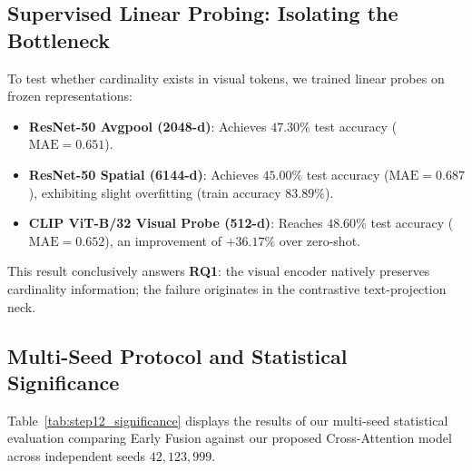\documentclass[conference]{IEEEtran}
\begin{document}
\subsection{Supervised Linear Probing: Isolating the Bottleneck}
To test whether cardinality exists in visual tokens, we trained linear probes on frozen representations:
\begin{itemize}
    \item \textbf{ResNet-50 Avgpool (2048-d)}: Achieves $47.30\%$ test accuracy ($\text{MAE}=0.651$).
    \item \textbf{ResNet-50 Spatial (6144-d)}: Achieves $45.00\%$ test accuracy ($\text{MAE}=0.687$), exhibiting slight overfitting (train accuracy $83.89\%$).
    \item \textbf{CLIP ViT-B/32 Visual Probe (512-d)}: Reaches $\mathbf{48.60\%}$ test accuracy ($\text{MAE}=0.652$), an improvement of $\mathbf{+36.17\%}$ over zero-shot.
\end{itemize}
This result conclusively answers \textbf{RQ1}: the visual encoder natively preserves cardinality information; the failure originates in the contrastive text-projection neck.

\subsection{Multi-Seed Protocol and Statistical Significance}
Table~\ref{tab:step12_significance} displays the results of our multi-seed statistical evaluation comparing Early Fusion against our proposed Cross-Attention model across independent seeds $42, 123, 999$.

\begin{table}[t]
\centering
\caption{Multi-Seed Statistical Significance Evaluation (Seeds 42, 123, 999) with Welch's $t$-test and 10,000-Resample Bootstrap 95\% CIs.}
\label{tab:step12_significance}
\end{table}
\end{document}
